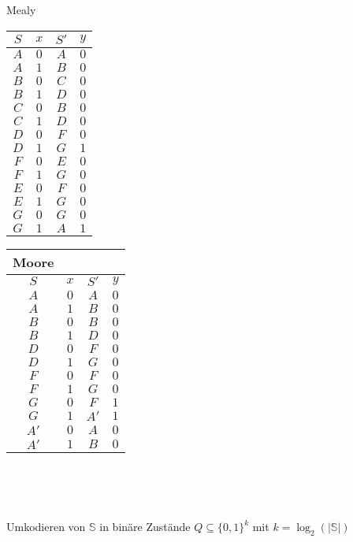 \documentclass{scrartcl}
\begin{document}
	Mealy\\
	\begin{tabular}{c c c c}
	\hline
	$S$ & $x$ & $S'$ & $y$\\	
	\hline
	$A$ & $0$ & $A$ & $0$\\
	$A$ & $1$ & $B$ & $0$\\
	$B$ & $0$ & $C$ & $0$\\
	$B$ & $1$ & $D$ & $0$\\
	$C$ & $0$ & $B$ & $0$\\
	$C$ & $1$ & $D$ & $0$\\
	$D$ & $0$ & $F$ & $0$\\
	$D$ & $1$ & $G$ & $1$\\
	$F$ & $0$ & $E$ & $0$\\
	$F$ & $1$ & $G$ & $0$\\
	$E$ & $0$ & $F$ & $0$\\
	$E$ & $1$ & $G$ & $0$\\
	$G$ & $0$ & $G$ & $0$\\
	$G$ & $1$ & $A$ & $1$\\
	\hline
	\end{tabular}
	\phantom{xxxxxxxxxxxxxxxxxxxxxxxxxxxxxxxxxxxxxxx}
	\begin{tabular}{c c c c}
	Moore\\
	\hline
	$S$ & $x$ & $S'$ & $y$ \\	
	\hline
	$A$ & $0$ & $A $& $0$\\
	$A$ & $1$ & $B $& $0$\\
	$B$ & $0$ & $B $& $0$\\
	$B$ & $1$ & $D $& $0$\\
	$D$ & $0$ & $F $& $0$\\
	$D$ & $1$ & $G $& $0$\\
	$F$ & $0$ & $F $& $0$\\
	$F$ & $1$ & $G $& $0$\\
	$G$ & $0$ & $F $& $1$\\
	$G$ & $1$ & $A'$& $1$\\
	$A'$& $0$ & $A$ & $0$\\
	$A'$& $1$ & $B$ & $0$\\
	\hline
	\end{tabular}
	\\~\\	


	\subsection{}
	Umkodieren von $\mathbb{S}$ in binäre Zustände $Q \subseteq\{0, 1\}^k$ mit $k = \log_2\left(\vert\mathbb{S}\vert\right)$\\~\\
\end{document}
